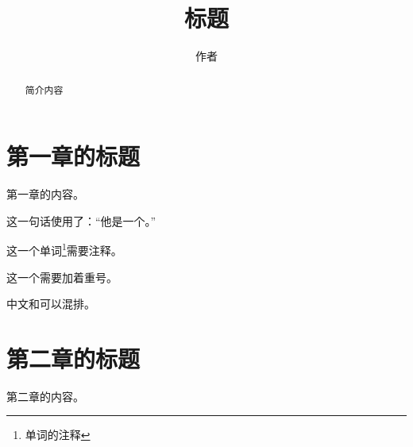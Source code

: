 \documentclass{article}
\title{标题}
\author{作者}
\begin{document}
\maketitle

\begin{abstract}
简介内容
\end{abstract}

\tableofcontents
\clearpage

\section{第一章的标题}

第一章的内容。

这一句话使用了：“他是一个。”

这一个单词\footnote{单词的注释}需要注释。

这一个需要加着重号。

中文和{\jpfont {}}可以混排。

\section{第二章的标题}

第二章的内容。
\end{document}
